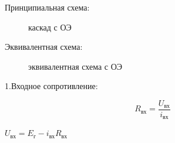 \documentclass[12pt,a4paper]{article}
\begin{document}
Принципиальная схема:
\begin{center}
	\begin{figure}[h!]
		\caption{каскад с ОЭ}	
		\label{OE}
	\end{figure}
\end{center}

Эквивалентная схема:
\begin{center}
	\begin{figure}[h!]
		\caption{эквивалентная схема с ОЭ}	
		\label{EOE}
	\end{figure}
\end{center}

1.Входное сопротивление:

$$R_\textit{вх}=\frac{U_\textit{вх}}{i_\textit{вх}}$$

$U_\textit{вх}=E_\textit{г}-i_\textit{вх}R_\textit{вх}$
\end{document}
